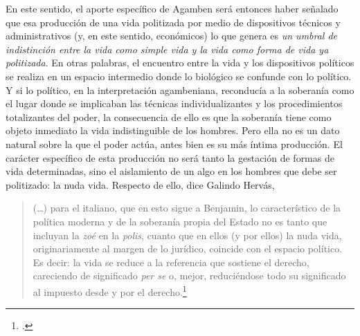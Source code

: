 En este sentido, el aporte específico de Agamben será entonces haber señalado que esa producción de una vida politizada por medio de dispositivos técnicos y administrativos (y, en este sentido, económicos) lo que genera es \emph{un umbral de indistinción entre la vida como simple vida y la vida como forma de vida ya politizada}. En otras palabras, el encuentro entre la vida y los dispositivos políticos se realiza en un espacio intermedio donde lo biológico se confunde con lo político. Y si lo político, en la interpretación agambeniana, reconducía a la soberanía como el lugar donde se implicaban las técnicas individualizantes y los procedimientos totalizantes del poder, la consecuencia de ello es que la soberanía tiene como objeto inmediato la vida indistinguible de los hombres. Pero ella no es un dato natural sobre la que el poder actúa, antes bien es su más íntima producción. El carácter específico de esta producción no será tanto la gestación de formas de vida determinadas, sino el aislamiento de un algo en los hombres que debe ser politizado: la nuda vida. Respecto de ello, dice Galindo Hervás,

\begin{quote}
(\ldots) para el italiano, que en esto sigue a Benjamin, lo característico de la política moderna y de la soberanía propia del Estado no es tanto que incluyan la \emph{zoé} en la \emph{polis}, cuanto que en ellos (y por ellos) la nuda vida, originariamente al margen de lo jurídico, coincide con el espacio político. Es decir: la vida se reduce a la referencia que sostiene el derecho, careciendo de significado \emph{per se} o, mejor, reduciéndose todo su significado al impuesto desde y por el derecho.\footcite[95]{@7088-GALINDOHERVAS2003}

\end{quote}

